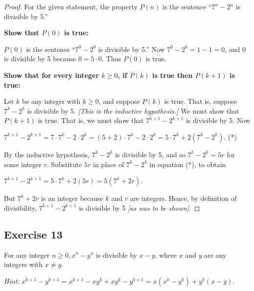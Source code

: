 \documentclass[14pt]{extarticle}
\begin{document}
\begin{proof}
For the given statement, the property $P(n)$ is the sentence “$7^n - 2^n$ is divisible by 5.” 

{\bf Show that $P(0)$ is true:} 

$P(0)$ is the sentence “$7^0 - 2^0$ is divisible by 5.” Now $7^0 - 2^0 = 1 - 1 = 0$, and 0 is divisible by 5 because $0 = 5 \cdot 0$. Thus $P(0)$ is true. 

{\bf Show that for every integer $k \geq 0$, if $P(k)$ is true then $P(k + 1)$ is true:} 

Let $k$ be any integer with $k \geq 0$, and suppose $P(k)$ is true. That is, suppose $7^k - 2^k$ is divisible by 5. {\it [This is the inductive hypothesis.]} We must show that $P(k + 1)$ is true. That is, we must show that $7^{k+1} - 2^{k+1}$ is divisible by 5. Now 

$7^{k+1} - 2^{k+1} = 7 \cdot 7^k - 2 \cdot 2^k = (5+2) \cdot 7^k - 2 \cdot 2^k = 5 \cdot 7^k + 2(7^k - 2^k)$. (*) 

By the inductive hypothesis, $7^k - 2^k$ is divisible by 5, and so $7^k - 2^k = 5r$ for some integer $r$. Substitute $5r$ in place of $7^k - 2^k$ in equation (*), to obtain 

$7^{k+1} - 2^{k+1} = 5 \cdot 7^k + 2(5r) = 5(7^k + 2r)$. 

But $7^k + 2r$ is an integer because $k$ and $r$ are integers. Hence, by definition of divisibility, $7^{k+1} - 2^{k+1}$ is divisible by 5 {\it [as was to be shown]}.
\end{proof}

\subsection{Exercise 13}
For any integer $n \geq 0, x^n - y^n$ is divisible by $x - y$, where $x$ and $y$ are any integers with $x \neq y$.

{\it Hint:} $x^{k+1} - y^{k+1} = x^{k+1} - xy^k + xy^k - y^{k+1} = x(x^k - y^k) + y^k(x-y)$.
\end{document}
